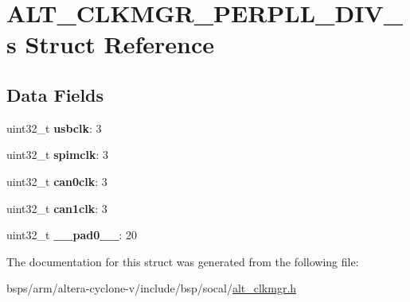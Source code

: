 \hypertarget{structALT__CLKMGR__PERPLL__DIV__s}{}\section{A\+L\+T\+\_\+\+C\+L\+K\+M\+G\+R\+\_\+\+P\+E\+R\+P\+L\+L\+\_\+\+D\+I\+V\+\_\+s Struct Reference}
\label{structALT__CLKMGR__PERPLL__DIV__s}
\subsection*{Data Fields}
\begin{DoxyCompactItemize}
\item 
\mbox{\label{structALT__CLKMGR__PERPLL__DIV__s_a7217ee3090b8d83b2395a21d3c5d3758}} 
uint32\+\_\+t {\bfseries usbclk}\+: 3
\item 
\mbox{\label{structALT__CLKMGR__PERPLL__DIV__s_a8286da4d37244a82f442e2511d68ad3e}} 
uint32\+\_\+t {\bfseries spimclk}\+: 3
\item 
\mbox{\label{structALT__CLKMGR__PERPLL__DIV__s_adbd1b376c57cf4ac3d3e828953948758}} 
uint32\+\_\+t {\bfseries can0clk}\+: 3
\item 
\mbox{\label{structALT__CLKMGR__PERPLL__DIV__s_a04b62ad683e7d9cda7f3026c19754ddb}} 
uint32\+\_\+t {\bfseries can1clk}\+: 3
\item 
\mbox{\label{structALT__CLKMGR__PERPLL__DIV__s_a5538e448c0d5bff5a6c0b24a6874c97a}} 
uint32\+\_\+t {\bfseries \+\_\+\+\_\+pad0\+\_\+\+\_\+}\+: 20
\end{DoxyCompactItemize}


The documentation for this struct was generated from the following file\+:\begin{DoxyCompactItemize}
\item 
bsps/arm/altera-\/cyclone-\/v/include/bsp/socal/\mbox{\hyperlink{alt__clkmgr_8h}{alt\+\_\+clkmgr.\+h}}\end{DoxyCompactItemize}
